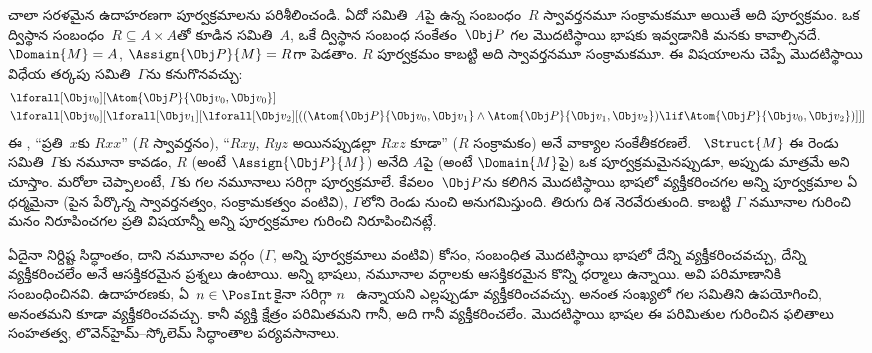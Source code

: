 \documentclass[../../../include/open-logic-section]{subfiles}
\begin{document}
చాలా సరళమైన ఉదాహరణగా పూర్వక్రమాలను పరిశీలించండి. ఏదో సమితి~$A$పై
ఉన్న సంబంధం~$R$ స్వావర్తనమూ సంక్రామకమూ అయితే అది పూర్వక్రమం. ఒక
ద్విస్థాన సంబంధం~$R \subseteq A \times A$తో కూడిన సమితి~$A$,
ఒకే ద్విస్థాన సంబంధ సంకేతం~$\Obj P$ గల మొదటిస్థాయి భాషకు
 ఇవ్వడానికి మనకు కావాల్సినదే. $\Domain{M} = A$,
$\Assign{\Obj P}{M} = R$గా పెడతాం. $R$ పూర్వక్రమం కాబట్టి అది
స్వావర్తనమూ సంక్రామకమూ. ఈ విషయాలను చెప్పే మొదటిస్థాయి విధేయ తర్కపు
 సమితి~$\Gamma$ను కనుగొనవచ్చు:
\begin{align*}
  & \lforall[\Obj v_0][\Atom{\Obj P}{\Obj v_0,\Obj v_0}]\\
  & \lforall[\Obj v_0][\lforall[\Obj v_1][\lforall[\Obj v_2][((\Atom{\Obj P}{\Obj v_0,\Obj v_1} \land \Atom{\Obj P}{\Obj v_1,\Obj v_2}) \lif \Atom{\Obj P}{\Obj v_0,\Obj v_2})]]]
\end{align*}
ఈ , ``ప్రతి~$x$కు $Rxx$'' ($R$ స్వావర్తనం),
``$Rxy$, $Ryz$ అయినప్పుడల్లా $Rxz$ కూడా'' ($R$ సంక్రామకం) అనే
వాక్యాల సంకేతీకరణలే. ~$\Struct{M}$ ఈ రెండు
 సమితి~$\Gamma$కు నమూనా కావడం, $R$ (అంటే
$\Assign{\Obj P}{M}$) అనేది $A$పై (అంటే $\Domain{M}$పై) ఒక
పూర్వక్రమమైనప్పుడూ, అప్పుడు మాత్రమే అని చూస్తాం. మరోలా చెప్పాలంటే,
$\Gamma$కు గల నమూనాలు సరిగ్గా పూర్వక్రమాలే. కేవలం~$\Obj P$ను
 కలిగిన మొదటిస్థాయి భాషలో వ్యక్తీకరించగల అన్ని
పూర్వక్రమాల ఏ ధర్మమైనా (పైన పేర్కొన్న స్వావర్తనత్వం, సంక్రామకత్వం వంటివి),
$\Gamma$లోని రెండు  నుంచి అనుగమిస్తుంది. తిరుగు దిశ
నెరవేరుతుంది. కాబట్టి $\Gamma$ నమూనాల గురించి మనం నిరూపించగల
ప్రతి విషయాన్నీ అన్ని పూర్వక్రమాల గురించి నిరూపించినట్లే.

ఏదైనా నిర్దిష్ట సిద్ధాంతం, దాని నమూనాల వర్గం ($\Gamma$, అన్ని
పూర్వక్రమాలు వంటివి) కోసం, సంబంధిత మొదటిస్థాయి భాషలో దేన్ని
వ్యక్తీకరించవచ్చు, దేన్ని వ్యక్తీకరించలేం అనే ఆసక్తికరమైన ప్రశ్నలు
ఉంటాయి. అన్ని భాషలు, నమూనాల వర్గాలకు ఆసక్తికరమైన కొన్ని
 ధర్మాలు ఉన్నాయి. అవి  పరిమాణానికి సంబంధించినవి.
ఉదాహరణకు, ఏ~$n \in \PosInt$కైనా  సరిగ్గా
$n$~ ఉన్నాయని ఎల్లప్పుడూ వ్యక్తీకరించవచ్చు. అనంత
సంఖ్యలో  గల సమితిని ఉపయోగించి,  అనంతమని కూడా
వ్యక్తీకరించవచ్చు. కానీ వ్యక్తి క్షేత్రం పరిమితమని గానీ, అది
 గానీ వ్యక్తీకరించలేం. మొదటిస్థాయి భాషల ఈ
పరిమితుల గురించిన ఫలితాలు సంహతత్వ, లొవెన్‌హైమ్--స్కోలెమ్ సిద్ధాంతాల
పర్యవసానాలు.
\end{document}
